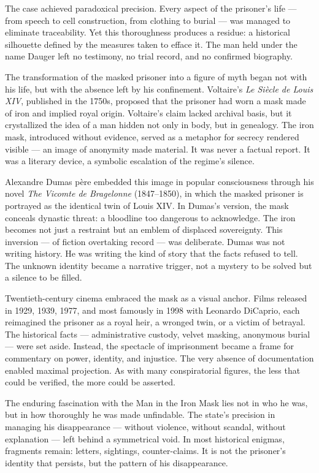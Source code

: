 The case achieved paradoxical precision. Every aspect of the prisoner’s life — from speech to cell construction, from clothing to burial — was managed to eliminate traceability. Yet this thoroughness produces a residue: a historical silhouette defined by the measures taken to efface it. The man held under the name Dauger left no testimony, no trial record, and no confirmed biography. 

The transformation of the masked prisoner into a figure of myth began not with his life, but with the absence left by his confinement. Voltaire’s \textit{Le Siècle de Louis XIV}, published in the 1750s, proposed that the prisoner had worn a mask made of iron and implied royal origin. Voltaire’s claim lacked archival basis, but it crystallized the idea of a man hidden not only in body, but in genealogy. The iron mask, introduced without evidence, served as a metaphor for secrecy rendered visible — an image of anonymity made material. It was never a factual report. It was a literary device, a symbolic escalation of the regime's silence.

Alexandre Dumas père embedded this image in popular consciousness through his novel \textit{The Vicomte de Bragelonne} (1847–1850), in which the masked prisoner is portrayed as the identical twin of Louis XIV. In Dumas’s version, the mask conceals dynastic threat: a bloodline too dangerous to acknowledge. The iron becomes not just a restraint but an emblem of displaced sovereignty. This inversion — of fiction overtaking record — was deliberate. Dumas was not writing history. He was writing the kind of story that the facts refused to tell. The unknown identity became a narrative trigger, not a mystery to be solved but a silence to be filled.

Twentieth-century cinema embraced the mask as a visual anchor. Films released in 1929, 1939, 1977, and most famously in 1998 with Leonardo DiCaprio, each reimagined the prisoner as a royal heir, a wronged twin, or a victim of betrayal. The historical facts — administrative custody, velvet masking, anonymous burial — were set aside. Instead, the spectacle of imprisonment became a frame for commentary on power, identity, and injustice. The very absence of documentation enabled maximal projection. As with many conspiratorial figures, the less that could be verified, the more could be asserted.

The enduring fascination with the Man in the Iron Mask lies not in who he was, but in how thoroughly he was made unfindable. The state's precision in managing his disappearance — without violence, without scandal, without explanation — left behind a symmetrical void. In most historical enigmas, fragments remain: letters, sightings, counter-claims. It is not the prisoner's identity that persists, but the pattern of his disappearance.

